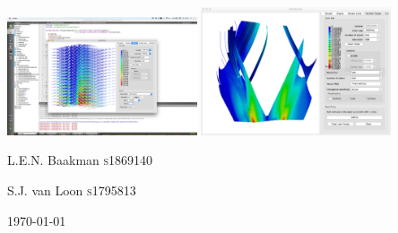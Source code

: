 \begin{titlepage}
        \vspace{10px}
        \includegraphics[width=0.42\textwidth, height=0.5\textheight, keepaspectratio=true]{img/titlepage/slices.png} \hspace{10px}
        \includegraphics[width=0.42\textwidth, height=0.5\textheight, keepaspectratio=true]{img/titlepage/streamsurfaces.png}        
    \vspace{2cm}\par

    {\Large L.E.N. Baakman \textsc{s}1869140\par}
    {\Large S.J. van Loon \textsc{s}1795813\par}

    \vfill
    {\large \today\par}
\end{titlepage}
\hypersetup{pageanchor=true}